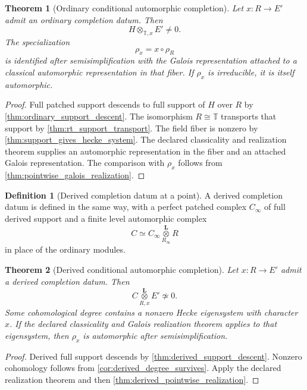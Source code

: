\documentclass{aomart}
\newtheorem{theorem}{Theorem}[section]
\theoremstyle{definition}
\newtheorem{definition}[definition]{Definition}
\theoremstyle{remark}
\newcommand{\TT}{\mathbb T}
\begin{document}
\begin{theorem}[Ordinary conditional automorphic completion]\label{thm:ordinary_conditional_completion}
Let \(x:R\to E'\) admit an ordinary completion datum. Then
\[
\boxed{
H\otimes_{\TT,x}E'\neq0.
}
\]
The specialization
\[
\rho_x=x\circ\rho_R
\]
is identified after semisimplification with the Galois representation attached to a classical automorphic representation in that fiber. If \(\rho_x\) is irreducible, it is itself automorphic.
\end{theorem}

\begin{proof}
Full patched support descends to full support of \(H\) over \(R\) by
\cref{thm:ordinary_support_descent}. The isomorphism \(R\cong\TT\) transports that support by \cref{thm:rt_support_transport}. The field fiber is nonzero by
\cref{thm:support_gives_hecke_system}. The declared classicality and realization theorem supplies an automorphic representation in the fiber and an attached Galois representation. The comparison with \(\rho_x\) follows from \cref{thm:pointwise_galois_realization}.
\end{proof}

\begin{definition}[Derived completion datum at a point]\label{def:derived_completion_datum}
A derived completion datum is defined in the same way, with a perfect patched complex
\(C_\infty\) of full derived support and a finite level automorphic complex
\[
C
\simeq
C_\infty
\mathbin{\mathop{\otimes}\limits_{R_\infty}^{\mathbf L}}R
\]
in place of the ordinary modules.
\end{definition}

\begin{theorem}[Derived conditional automorphic completion]\label{thm:derived_conditional_completion}
Let \(x:R\to E'\) admit a derived completion datum. Then
\[
\boxed{
C\mathbin{\mathop{\otimes}\limits_{R,x}^{\mathbf L}}E'
\not\simeq0.
}
\]
Some cohomological degree contains a nonzero Hecke eigensystem with character \(x\). If the declared classicality and Galois realization theorem applies to that eigensystem, then \(\rho_x\) is automorphic after semisimplification.
\end{theorem}

\begin{proof}
Derived full support descends by \cref{thm:derived_support_descent}. Nonzero cohomology follows from \cref{cor:derived_degree_survives}. Apply the declared realization theorem and then \cref{thm:derived_pointwise_realization}.
\end{proof}
\end{document}

